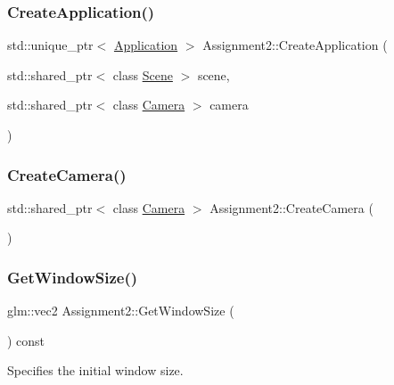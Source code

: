 \subsubsection{\texorpdfstring{Create\+Application()}{CreateApplication()}}
{\footnotesize\ttfamily std\+::unique\+\_\+ptr$<$ \hyperlink{class_application}{Application} $>$ Assignment2\+::\+Create\+Application (\begin{DoxyParamCaption}\item[{std\+::shared\+\_\+ptr$<$ class \hyperlink{class_scene}{Scene} $>$}]{scene,  }\item[{std\+::shared\+\_\+ptr$<$ class \hyperlink{class_camera}{Camera} $>$}]{camera }\end{DoxyParamCaption})\hspace{0.3cm}{\ttfamily [static]}}

\hypertarget{class_assignment2_a285e6d6ff330c03e28e49660ec178fa4}{}\label{class_assignment2_a285e6d6ff330c03e28e49660ec178fa4} 
\subsubsection{\texorpdfstring{Create\+Camera()}{CreateCamera()}}
{\footnotesize\ttfamily std\+::shared\+\_\+ptr$<$ class \hyperlink{class_camera}{Camera} $>$ Assignment2\+::\+Create\+Camera (\begin{DoxyParamCaption}{ }\end{DoxyParamCaption})\hspace{0.3cm}{\ttfamily [static]}}

\hypertarget{class_assignment2_a9ea79bd468c12dde5159ca7b8efd8e1e}{}\label{class_assignment2_a9ea79bd468c12dde5159ca7b8efd8e1e} 
\subsubsection{\texorpdfstring{Get\+Window\+Size()}{GetWindowSize()}}
{\footnotesize\ttfamily glm\+::vec2 Assignment2\+::\+Get\+Window\+Size (\begin{DoxyParamCaption}{ }\end{DoxyParamCaption}) const\hspace{0.3cm}{\ttfamily [virtual]}}



Specifies the initial window size. 

